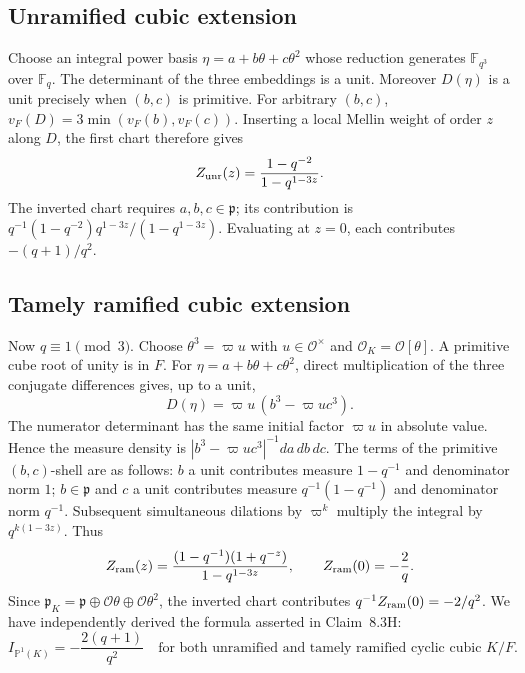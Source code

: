 \documentclass[12pt,letterpaper]{amsart}
\begin{document}
\subsection*{Unramified cubic extension}
Choose an integral power basis $\eta=a+b\theta+c\theta^2$ whose reduction generates $\mathbb F_{q^3}$ over $\mathbb F_q$. The determinant of the three embeddings is a unit. Moreover $D(\eta)$ is a unit precisely when $(b,c)$ is primitive. For arbitrary $(b,c)$, $v_F(D)=3\min(v_F(b),v_F(c))$. Inserting a local Mellin weight of order $z$ along $D$, the first chart therefore gives
\[
Z_{\rm unr}(z)=\frac{1-q^{-2}}{1-q^{1-3z}}.
\]
The inverted chart requires $a,b,c\in\mathfrak p$; its contribution is
$q^{-1}(1-q^{-2})q^{1-3z}/(1-q^{1-3z})$. Evaluating at $z=0$, each contributes $-(q+1)/q^2$.

\subsection*{Tamely ramified cubic extension}
Now $q\equiv1\pmod3$. Choose $\theta^3=\varpi u$ with $u\in\mathcal O^\times$ and $\mathcal O_K=\mathcal O[\theta]$. A primitive cube root of unity is in $F$. For $\eta=a+b\theta+c\theta^2$, direct multiplication of the three conjugate differences gives, up to a unit,
\[
D(\eta)=\varpi u\,(b^3-\varpi u c^3).
\]
The numerator determinant has the same initial factor $\varpi u$ in absolute value. Hence the measure density is $|b^3-\varpi u c^3|^{-1}da\,db\,dc$. The terms of the primitive $(b,c)$-shell are as follows: $b$ a unit contributes measure $1-q^{-1}$ and denominator norm $1$; $b\in\mathfrak p$ and $c$ a unit contributes measure $q^{-1}(1-q^{-1})$ and denominator norm $q^{-1}$. Subsequent simultaneous dilations by $\varpi^k$ multiply the integral by $q^{k(1-3z)}$. Thus
\[
Z_{\rm ram}(z)=\frac{(1-q^{-1})(1+q^{-z})}{1-q^{1-3z}},\qquad
Z_{\rm ram}(0)=-\frac2q.
\]
Since $\mathfrak p_K=\mathfrak p\oplus\mathcal O\theta\oplus\mathcal O\theta^2$, the inverted chart contributes $q^{-1}Z_{\rm ram}(0)=-2/q^2$. We have independently derived the formula asserted in Claim~8.3H:
\begin{equation}\label{eq:Iproj}
I_{\mathbb P^1(K)}=-\frac{2(q+1)}{q^2}
\quad\text{for both unramified and tamely ramified cyclic cubic }K/F.
\end{equation}
\end{document}
